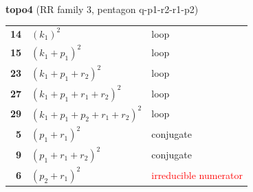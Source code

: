 \documentclass[10pt]{article}
\begin{document}
\begin{minipage}[t]{0.48\textwidth}
{}\\[2mm]\textbf{topo4} (RR family 3, pentagon q-p1-r2-r1-p2)\\[2pt]{\footnotesize\begin{tabular}{@{}r@{\ \ }l@{\ \ }l@{}}\textbf{14} & $(k_1)^2$ & loop\\
\textbf{15} & $(k_1+p_1)^2$ & loop\\
\textbf{23} & $(k_1+p_1+r_2)^2$ & loop\\
\textbf{27} & $(k_1+p_1+r_1+r_2)^2$ & loop\\
\textbf{29} & $(k_1+p_1+p_2+r_1+r_2)^2$ & loop\\
\textbf{5} & $(p_1+r_1)^2$ & conjugate\\
\textbf{9} & $(p_1+r_1+r_2)^2$ & conjugate\\
\textbf{6} & $(p_2+r_1)^2$ & \textcolor{red}{irreducible numerator}\\\end{tabular}}\end{minipage}

\bigskip
\end{document}
